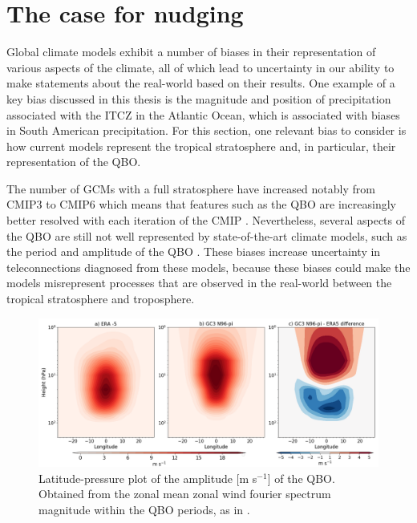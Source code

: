 \section{The case for nudging}



Global climate models exhibit a number of biases in their representation of various aspects of the climate, all of which lead to uncertainty in our ability to make statements about the real-world based on their results. One example of a key bias discussed in this thesis is the magnitude and position of precipitation associated with the ITCZ in the Atlantic Ocean, which is associated with biases in South American precipitation. %
For this section, one relevant bias to consider is how current models represent the tropical stratosphere and, in particular, their representation of the QBO.




The number of GCMs with a full stratosphere have increased notably from CMIP3 to CMIP6 which means that features such as the QBO are increasingly better resolved with each iteration of the CMIP \citep{bushell2020,richter2020}. Nevertheless, several aspects of the QBO are still not well represented by state-of-the-art climate models, such as the period and amplitude of the QBO \citep{schenzinger2017,richter2020}. 
These biases increase uncertainty in teleconnections diagnosed from these models, because these biases could make the models misrepresent processes that are observed in the real-world between the tropical stratosphere and troposphere.

\begin{figure}[t!]
\centering
 \includegraphics[width=\linewidth]{figures/qboamplitude.png}
\caption[QBO amplitude bias]{Latitude-pressure plot of the amplitude [m s$^{-1}$] of the QBO. Obtained from the zonal mean zonal wind fourier spectrum magnitude within the QBO periods, as in \cite{schenzinger2017}. }
\label{fig:qboamplitude}
\end{figure}

